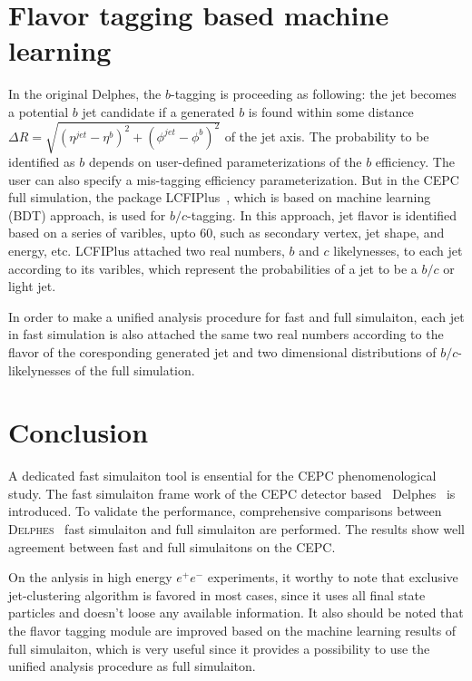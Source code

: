 \documentclass[a4paper,10pt,twoside]{cpc-hepnp}
\begin{document}
\begin{multicols}{2}
\section{Flavor tagging based machine learning\label{b-tagging}}
In the original {\textsf{Delphes}}, the $b$-tagging is proceeding as following:
the jet becomes a potential $b$ jet candidate if a generated $b$ is found within
some distance $\Delta R = \sqrt{(\eta^{jet}-\eta^b)^2+(\phi^{jet}-\phi^b)^2}$ of the jet axis.
The probability to be identified as $b$ depends on user-defined parameterizations of the $b$ efficiency.
The user can also specify a mis-tagging efficiency parameterization.
But in the CEPC full simulation, the package LCFIPlus~\cite{ref:lcfiplus},
which is based on machine learning (BDT) approach, is used for $b/c$-tagging.
In this approach, jet flavor is identified based on a series of varibles, upto 60, such as secondary vertex, jet shape, and energy, etc.
LCFIPlus attached two real numbers, $b$ and $c$ likelynesses, to each jet according to its varibles,
which represent the probabilities of a jet to be a $b/c$ or light jet.

In order to make a unified analysis procedure for fast and full simulaiton,
each jet in fast simulation is also attached the same two real numbers according to the flavor of the coresponding generated jet
and two dimensional distributions of $b/c$-likelynesses of the full simulation.

\section{Conclusion\label{sec:conclusion}}
A dedicated fast simulaiton tool is ensential for the CEPC phenomenological study.
The fast simulaiton  frame work of the CEPC detector based {~\textsf{Delphes}~} is introduced. 
To validate the performance, comprehensive comparisons between {\textsc{Delphes}~} fast simulaiton and full simulaiton are performed.
The results show  well agreement between fast and full simulaitons on the CEPC.

On the anlysis in high energy $e^+e^-$ experiments, it worthy to note that exclusive jet-clustering algorithm is favored in most cases,
since it uses all final state particles and doesn't loose any available information. 
It also should be noted that the flavor tagging module are improved based on the machine learning results of full simulaiton, 
which is very useful since it provides a possibility to use the unified analysis procedure as full simulaiton.
\vspace{3mm}


\end{multicols}
\end{document}
